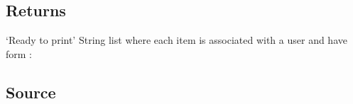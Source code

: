 \documentclass[letterpaper,10pt,english]{sphinxmanual}
\begin{document}
\subsection{Returns}
\label{\detokenize{OUP/Treat_Info:returns}}
\sphinxAtStartPar
{}

\sphinxAtStartPar
‘Ready to print’ String list where each item is associated with a user and have form : 


\subsection{Source}
\label{\detokenize{OUP/Treat_Info:source}}
\begin{sphinxVerbatim}[commandchars=\\\{\}]
 


\end{sphinxVerbatim}
\end{document}
